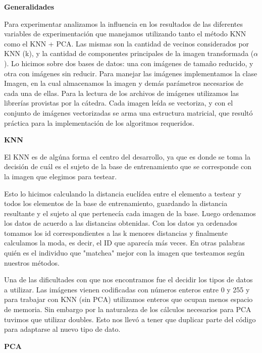 
\textbf{Generalidades}

Para experimentar analizamos la influencia en los resultados de las diferentes variables de experimentación que manejamos utilizando tanto el método KNN como el KNN + PCA. 
Las mismas son la cantidad de vecinos considerados por KNN (k), y la cantidad de componentes principales de la imagen transformada ($\alpha$).
Lo hicimos sobre dos bases de datos: una con im\'agenes de tamaño reducido, y otra con imágenes sin reducir.
Para manejar las imágenes implementamos la clase Imagen, en la cual almacenamos la imagen y demás parámetros necesarios de cada una de ellas.
Para la lectura de los archivos de imágenes utilizamos las librerías provistas por la cátedra.
Cada imagen leída se vectoriza, y con el conjunto de imágenes vectorizadas se arma una estructura matricial, que resultó práctica para la implementación de los algoritmos requeridos.

\textbf{KNN}

El KNN es de algúna forma el centro del desarrollo, ya que es donde se toma la decisión de cuál es el sujeto de la base de entrenamiento que se corresponde con la imagen que elegimos para testear.

Esto lo hicimos calculando la distancia euclídea entre el elemento a testear y todos los elementos de la base de entrenamiento, guardando la distancia resultante y el sujeto al que pertenecía cada imagen de la base. Luego ordenamos los datos de acuerdo a las distancias obtenidas. Con los datos ya ordenados tomamos los id correspondientes a las k menores distancias y finalmente calculamos la moda, es decir, el ID que  aparecía más veces. En otras palabras quién es el individuo que "matchea" mejor con la imagen que testeamos según nuestros métodos. 

\par Una de las dificultades con que nos encontramos fue el decidir los tipos de datos a utilizar. Las imágenes vienen codificadas con números enteros entre 0 y 255 y para trabajar con KNN (sin PCA) utilizamos enteros que ocupan menos espacio de memoria. Sin embargo por la naturaleza de los cálculos necesarios para PCA tuvimos que utilizar doubles. Esto nos llevó a tener que duplicar parte del código para adaptarse al nuevo tipo de dato.


\textbf{PCA}

